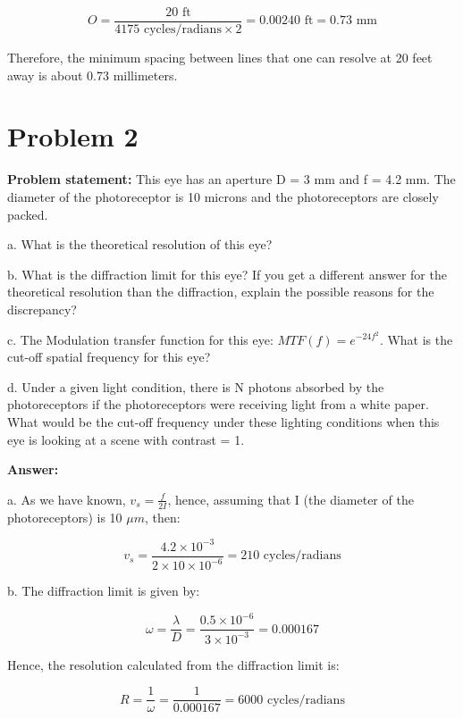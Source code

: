 \documentclass[letterpaper, 11pt]{article}
\begin{document}
\begin{equation}
	O = \frac{20 \text{ ft}}{4175 \text{ cycles/radians} \times 2} = 0.00240 \text{ ft} = 0.73 \text{ mm}
\end{equation}

Therefore, the minimum spacing between lines that one can resolve at 20 feet away is about 0.73 millimeters.

\section{Problem 2}
\label{sec:prob2}
\textbf{Problem statement:} This eye has an aperture D = 3 mm and f = 4.2 mm. The diameter of the photoreceptor is 10 microns and the photoreceptors are closely packed.

a. What is the theoretical resolution of this eye?

b. What is the diffraction limit for this eye? If you get a different answer for the theoretical resolution than the diffraction, explain the possible reasons for the discrepancy?

c. The Modulation transfer function for this eye: $MTF(f) = e^{-24f^2}$. What is the cut-off spatial frequency for this eye?

d. Under a given light condition, there is N photons absorbed by the photoreceptors if the photoreceptors were receiving light from a white paper. What would be the cut-off frequency under these lighting conditions when this eye is looking at a scene with contrast = 1.

\textbf{Answer:}

a. As we have known, $v_s = \frac{f}{2I}$, hence, assuming that I (the diameter of the photoreceptors) is 10 $\mu m$, then:

\begin{equation}
	v_s = \frac{4.2 \times 10^{-3}}{2\times 10\times 10^{-6}} = 210 \text{ cycles/radians}
\end{equation}

b. The diffraction limit is given by:

\begin{equation}
	\omega = \frac{\lambda}{D} = \frac{0.5\times 10^{-6}}{3\times 10^{-3}} = 0.000167
\end{equation}

Hence, the resolution calculated from the diffraction limit is:

\begin{equation}
	R = \frac{1}{\omega} = \frac{1}{0.000167} = 6000 \text{ cycles/radians}
\end{equation}
\end{document}
